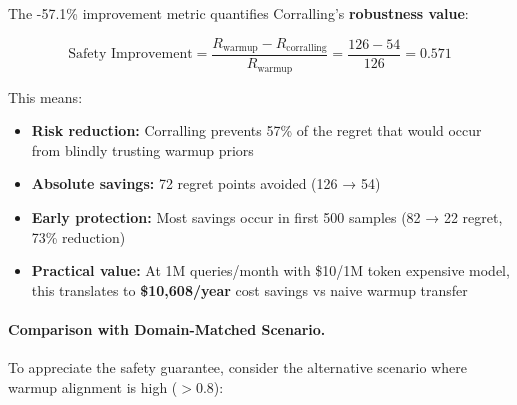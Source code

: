 The -57.1\% improvement metric quantifies Corralling's \textbf{robustness value}:

\begin{equation}
\text{Safety Improvement} = \frac{R_{\text{warmup}} - R_{\text{corralling}}}{R_{\text{warmup}}} = \frac{126 - 54}{126} = 0.571
\end{equation}

This means:
\begin{itemize}[leftmargin=*,nosep]
    \item \textbf{Risk reduction:} Corralling prevents 57\% of the regret that would occur from blindly trusting warmup priors
    \item \textbf{Absolute savings:} 72 regret points avoided (126 → 54)
    \item \textbf{Early protection:} Most savings occur in first 500 samples (82 → 22 regret, 73\% reduction)
    \item \textbf{Practical value:} At 1M queries/month with \$10/1M token expensive model, this translates to \textbf{\$10,608/year} cost savings vs naive warmup transfer
\end{itemize}

\paragraph{Comparison with Domain-Matched Scenario.}
To appreciate the safety guarantee, consider the alternative scenario where warmup alignment is high ($>0.8$):


